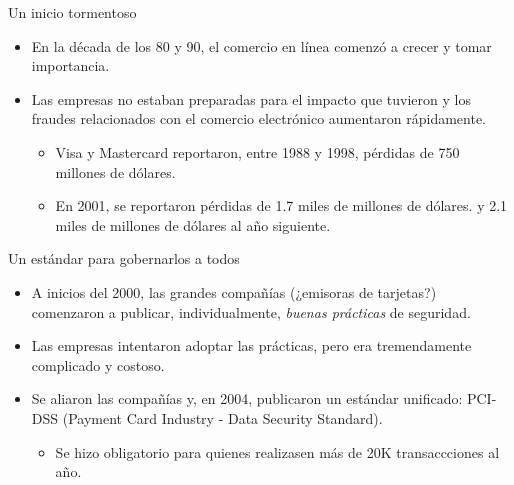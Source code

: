 %
%
%


\begin{frame}{Un inicio tormentoso}
  \begin{itemize}
    \item En la década de los 80 y 90, el comercio en línea comenzó a crecer y
      tomar importancia.
    \item Las empresas no estaban preparadas para el impacto que tuvieron y
      los fraudes relacionados con el comercio electrónico aumentaron
      rápidamente.
      \begin{itemize}
        \item Visa y Mastercard reportaron, entre 1988 y 1998, pérdidas de 750
          millones de dólares.
        \item En 2001, se reportaron pérdidas de 1.7 miles de millones de
          dólares. y  2.1 miles de millones de dólares al año siguiente.
      \end{itemize}
  \end{itemize}
\end{frame}

\begin{frame}{Un estándar para gobernarlos a todos}
  \begin{itemize}
    \item A inicios del 2000, las grandes compañías (¿emisoras de tarjetas?)
      comenzaron a publicar, individualmente, \textit{buenas prácticas} de
      seguridad.
    \item Las empresas intentaron adoptar las prácticas, pero era tremendamente
      complicado y costoso.
    \item Se aliaron las compañías y, en 2004, publicaron un estándar unificado:
      PCI-DSS (Payment Card Industry - Data Security Standard).
      \begin{itemize}
        \item Se hizo obligatorio para quienes realizasen más de 20K
          transaccciones al año.
      \end{itemize}
  \end{itemize}
\end{frame}

